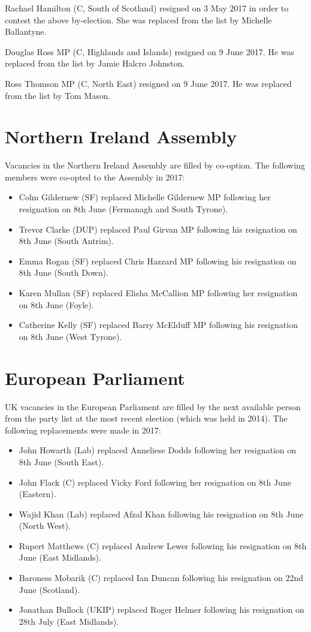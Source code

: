 \documentclass[a4paper,openany]{book}
\begin{document}
Rachael Hamilton (C, South of Scotland) resigned on 3 May 2017 in order to contest the above by-election.  She was replaced from the list by Michelle Ballantyne.

Douglas Ross MP (C, Highlands and Islands) resigned on 9 June 2017.  He was replaced from the list by Jamie Halcro Johnston.

Ross Thomson MP (C, North East) resigned on 9 June 2017.  He was replaced from the list by Tom Mason.

\section{Northern Ireland Assembly}

Vacancies in the Northern Ireland Assembly are filled by co-option.
%
The following members were co-opted to the Assembly in 2017:
\begin{itemize}
\item Colm Gildernew (SF) replaced Michelle Gildernew MP following her resignation on 8th June (Fermanagh and South Tyrone).
\item Trevor Clarke (DUP) replaced Paul Girvan MP following his resignation on 8th June (South Antrim).
\item Emma Rogan (SF) replaced Chris Hazzard MP following his resignation on 8th June (South Down).
\item Karen Mullan (SF) replaced Elisha McCallion MP following her resignation on 8th June (Foyle).
\item Catherine Kelly (SF) replaced Barry McElduff MP following his resignation on 8th June (West Tyrone).
\end{itemize}

\section{European Parliament}

UK vacancies in the European Parliament are filled by the next available person from the party list at the most recent election (which was held in 2014). 
The following replacements were made in 2017:
\begin{itemize}
\item John Howarth (Lab) replaced Anneliese Dodds following her resignation on 8th June (South East).
\item John Flack (C) replaced Vicky Ford following her resignation on 8th June (Eastern).
\item Wajid Khan (Lab) replaced Afzal Khan following his resignation on 8th June (North West).
\item Rupert Matthews (C) replaced Andrew Lewer following his resignation on 8th June (East Midlands).
\item Baroness Mobarik (C) replaced Ian Duncan following his resignation on 22nd June (Scotland).
\item Jonathan Bullock (UKIP) replaced Roger Helmer following his resignation on 28th July (East Midlands).
\end{itemize}
\end{document}
